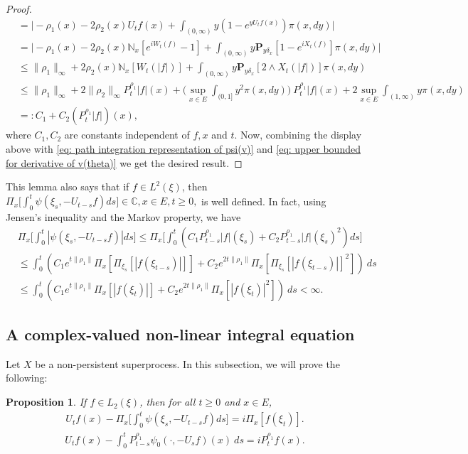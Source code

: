 \documentclass[12pt,a4paper]{amsart}
\theoremstyle{plain}
\newtheorem{prop}[thm]{Proposition}
\theoremstyle{definition}
\numberwithin{equation}{section}
\begin{document}
\begin{proof}
\begin{align}
    & = \Big| -\rho_1(x)- 2\rho_2(x) U_tf(x)+ \int_{(0,\infty)} y (1- e^{y U_tf(x)} ) \pi(x,dy)\Big| \\
    & = \Big| - \rho_1(x)- 2\rho_2(x)\mathbb N_x[e^{i W_t(f)} - 1]  + \int_{(0,\infty)} y \mathbf P_{y \delta_x}[1-e^{i X_t(f)}] \pi(x,dy) \Big| \\
    & \leq \|\rho_1\|_\infty + 2\rho_2(x)\mathbb N_x[W_t(|f|)]+ \int_{(0,\infty)} y\mathbf P_{y\delta_x}[2\wedge X_t(|f|)] \pi(x,dy) \\
    & \leq \|\rho_1\|_\infty + 2\|\rho_2\|_\infty P^{\rho_1}_t |f|(x) + \Big(\sup_{x\in E}\int_{(0,1]}y^2 \pi(x,dy)\Big)~P^{\rho_1}_t |f|(x) + 2\sup_{x\in E}\int_{(1,\infty)} y \pi(x,dy) \\
    & =: C_1 + C_2(P^{\rho_1}_t |f|)(x), \label{eq: upper bound of psi'(v)}
  \end{align}
where $C_1, C_2$ are constants independent of $f,x$ and $t$.
  Now, combining the display above with \eqref{eq: path integration representation of psi(v)} and \eqref{eq: upper bounded for derivative of v(theta)} we get the desired result.
\end{proof}

This lemma also says that if $f\in L^2(\xi)$, then
$
  \Pi_x\Big[\int_0^t \psi(\xi_s,- U_{t-s}f)ds\Big]
  \in \mathbb C,
 x\in E, t\geq 0,$
is well defined.
In fact, using Jensen's inequality and the Markov property, we have
\begin{align}
  \label{eq: domination of psi(v)}
  & \Pi_x\Big[\int_0^t |\psi (\xi_s,-U_{t-s}f )|ds\Big]
  \leq \Pi_x\Big[\int_0^t (C_1 P_{t-s}^{\rho_1}|f|(\xi_s)+C_2 P_{t-s}^{\rho_1}|f|(\xi_s)^2 )ds\Big] \\
  & \leq \int_0^t (C_1 e^{t\|\rho_1\|}\Pi_x [ \Pi_{\xi_s}[|f(\xi_{t-s})|] ]+C_2 e^{2t\|\rho_1\|}\Pi_x [ \Pi_{\xi_s}[|f (\xi_{t-s})|]^2 ] )~ds \\
  & \leq \int_0^t (C_1 e^{t\|\rho_1\|}\Pi_x [ |f(\xi_{t})|]+C_2e^{2t\|\rho_1\|}\Pi_x [ |f (\xi_{t})|^2 ])~ds < \infty.
\end{align}

\subsection{A complex-valued non-linear integral equation}
Let $X$ be a non-persistent superprocess.
In this subsection, we will prove the following:

\begin{prop}
  \label{prop: complex FKPP-equation}
  If $f\in L_2(\xi)$,  then for all $t\geq 0$ and $x\in E$,
\begin{align}
  \label{eq: complex FKPP-equation}
  U_tf(x) - \Pi_x \Big[\int_0^t \psi (\xi_s, - U_{t-s}f ) ds \Big]
  = i \Pi_x [f(\xi_t)].
\end{align}
\begin{align}
  \label{eq: complex FKPP-equation with FK-transform}
  U_tf(x) -  \int_0^t P_{t-s}^{\rho_1} \psi_0(\cdot,-U_sf) (x)~ds
  = iP_t^{\rho_1} f(x).
\end{align}
\end{prop}
\end{document}
